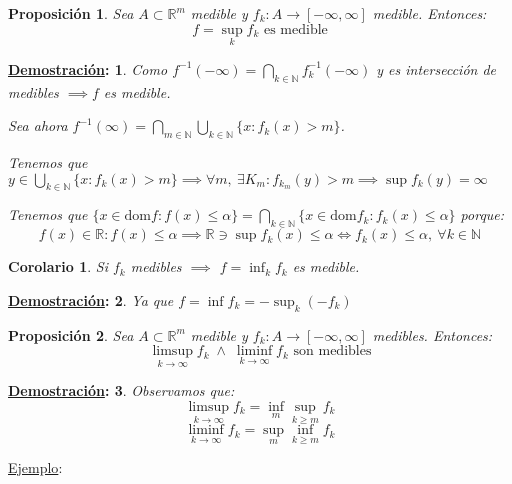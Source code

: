\documentclass[10pt,a4paper,openright]{book}
\theoremstyle{break}
\newtheorem*{coro}{Corolario}
\newtheorem*{prop}{Proposición}
\newtheorem*{demo}{\underline{Demostración}:}
\begin{document}
\begin{prop}
Sea $A \subset \mathbb{R}^m$ medible y $f_k: A \to \left[-\infty, \infty\right]$ medible. Entonces:
$$f = \sup_k f_k \text{ es medible}$$
\end{prop}
\begin{demo}
Como $f^{-1}\left(-\infty\right) = \bigcap_{k \in \mathbb{N}}f^{-1}_k\left(-\infty\right)$ y es intersección de medibles $\implies f$ es medible. 

Sea ahora $f^{-1}\left(\infty\right) = \bigcap_{m \in \mathbb{N}}\bigcup_{k \in \mathbb{N}}\{x : f_k \left(x\right) > m\}$. 

Tenemos que $y \in \bigcup_{k \in \mathbb{N}}\{x: f_k\left(x\right) > m\} \implies \forall m,\ \exists K_m: f_{k_m}\left(y\right) > m \implies \sup f_k\left(y\right) = \infty$

Tenemos que $\{x \in \mathrm{dom}f: f\left(x\right) \le \alpha\} = \bigcap_{k \in \mathbb{N}}\{x \in \mathrm{dom} f_k: f_k\left(x\right) \le \alpha\}$ porque:
$$f\left(x\right) \in \mathbb{R}: f\left(x\right) \le \alpha \implies \mathbb{R} \ni \sup f_k\left(x\right) \le \alpha \iff f_k\left(x\right) \le \alpha,\ \forall k \in \mathbb{N}$$
\end{demo}

\begin{coro}
Si $f_k$ medibles $\implies$ $f = \inf_k f_k$ es medible.
\end{coro}
\begin{demo}
Ya que $f = \inf f_k = -\sup_k \left(-f_k\right)$
\end{demo}

\begin{prop}
Sea $A \subset \mathbb{R}^m$ medible y $f_k: A \to \left[-\infty, \infty\right]$ medibles. Entonces:
$$\limsup_{k \to \infty}f_k\; \land \;\liminf_{k \to \infty}f_k \text{ son medibles}$$
\end{prop}
\begin{demo}
Observamos que:
$$\limsup_{k \to \infty}f_k = \inf_m \sup_{k\ge m} f_k$$
$$\liminf_{k \to \infty}f_k = \sup_m \inf_{k\ge m}f_k$$
\end{demo}

\underline{Ejemplo}: 
\end{document}
